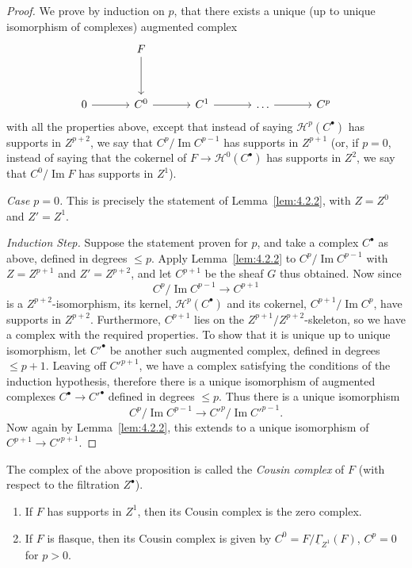 \begin{proof}
We prove by induction on $p$, that there exists a unique (up to unique isomorphism of complexes) augmented complex
\[
\begin{tikzcd}[row sep=1.2cm, column sep=1.2cm]
	& F \arrow[d] & & \\
	0 \arrow[r] & C^0 \arrow[r] & C^1 \arrow[r] & \dots \arrow[r] & C^p
\end{tikzcd}
\]
with all the properties above, except that instead of saying $\mathcal{H}^p(C^\bullet)$ has supports in $Z^{p+2}$, we say that $C^p/\operatorname{Im} C^{p-1}$ has supports in $Z^{p+1}$ (or, if $p=0$, instead of saying that the cokernel of $F\to \mathcal{H}^0(C^\bullet)$ has supports in $Z^2$, we say that $C^0/\operatorname{Im} F$ has supports in $Z^1$).

\emph{Case $p=0$.} This is precisely the statement of Lemma~\ref{lem:4.2.2}, with $Z=Z^0$ and $Z'=Z^1$.

\emph{Induction Step.} Suppose the statement proven for $p$, and take a complex $C^\bullet$ as above, defined in degrees $\leq p$. Apply Lemma~\ref{lem:4.2.2} to $C^p/\operatorname{Im} C^{p-1}$ with $Z=Z^{p+1}$ and $Z'=Z^{p+2}$, and let $C^{p+1}$ be the sheaf $G$ thus obtained. Now since
\[
C^p/\operatorname{Im} C^{p-1}\longrightarrow C^{p+1}
\]
is a $Z^{p+2}$-isomorphism, its kernel, $\mathcal{H}^p(C^\bullet)$ and its cokernel, $C^{p+1}/\operatorname{Im} C^p$, have supports in $Z^{p+2}$. Furthermore, $C^{p+1}$ lies on the $Z^{p+1}/Z^{p+2}$-skeleton, so we have a complex with the required properties. To show that it is unique up to unique isomorphism, let $C'^\bullet$ be another such augmented complex, defined in degrees $\leq p+1$. Leaving off $C'^{p+1}$, we have a complex satisfying the conditions of the induction hypothesis, therefore there is a unique isomorphism of augmented complexes $C^\bullet\to C'^\bullet$ defined in degrees $\leq p$. Thus there is a unique isomorphism
\[
C^p/\operatorname{Im} C^{p-1}\longrightarrow C'^p/\operatorname{Im} C'^{p-1}.
\]
Now again by Lemma~\ref{lem:4.2.2}, this extends to a unique isomorphism of $C^{p+1}\longrightarrow C'^{p+1}$.
\end{proof}

\begin{definition*}
The complex of the above proposition is called the \emph{Cousin complex} of $F$ (with respect to the filtration $Z^\bullet$).
\end{definition*}

\begin{example*}
\begin{enumerate}
\item[(1)] If $F$ has supports in $Z^1$, then its Cousin complex is the zero complex.
\item[(2)] If $F$ is flasque, then its Cousin complex is given by $C^0=F/\underline{\Gamma}_{Z^1}(F)$, $C^p=0$ for $p>0$.
\end{enumerate}
\end{example*}

